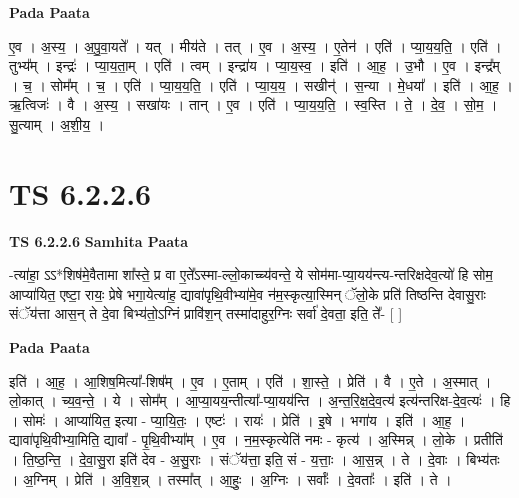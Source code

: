 \documentclass[17pt]{extarticle}
\begin{document}
\textbf{Pada Paata} \newline

ए॒व । अ॒स्य॒ । अ॒पु॒वा॒यते᳚ । यत् । मीय॑ते । तत् । ए॒व । अ॒स्य॒ । ए॒तेन॑ । एति॑ । प्या॒य॒य॒ति॒ । एति॑ । तुभ्य᳚म् । इन्द्रः॑ । प्या॒य॒ता॒म् । एति॑ । त्वम् । इन्द्रा॑य । प्या॒य॒स्व॒ । इति॑ । आ॒ह॒ । उ॒भौ । ए॒व । इन्द्र᳚म् । च॒ । सोम᳚म् । च॒ । एति॑ । प्या॒य॒य॒ति॒ । एति॑ । प्या॒य॒य॒ । सखीन्॑ । स॒न्या । मे॒धया᳚ । इति॑ । आ॒ह॒ । ऋ॒त्विजः॑ । वै । अ॒स्य॒ । सखा॑यः । तान् । ए॒व । एति॑ । प्या॒य॒य॒ति॒ । स्व॒स्ति । ते॒ । दे॒व॒ । सो॒म॒ । सु॒त्याम् । अ॒शी॒य॒ ।  \newline




\section*{ TS 6.2.2.6 }

\textbf{TS 6.2.2.6 } \newline
\textbf{Samhita Paata} \newline

-त्या॑हा॒ ऽऽ*शिष॑मे॒वैतामा शा᳚स्ते॒ प्र वा ए॒ते᳚ऽस्मा-ल्लो॒काच्च्य॑वन्ते॒ ये सोम॑मा-प्या॒यय॑न्त्य-न्तरिक्षदेव॒त्यो॑ हि सोम॒ आप्या॑यित॒ एष्टा॒ रायः॒ प्रेषे भगा॒येत्या॑ह॒ द्यावा॑पृथि॒वीभ्या॑मे॒व न॑म॒स्कृत्या॒स्मिन् ॅलो॒के प्रति॑ तिष्ठन्ति देवासु॒राः संॅय॑त्ता आस॒न् ते दे॒वा बिभ्य॑तो॒ऽग्निं प्रावि॑श॒न् तस्मा॑दाहुर॒ग्निः सर्वा॑ दे॒वता॒ इति॒ ते᳚- [  ] \newline

\textbf{Pada Paata} \newline

इति॑ । आ॒ह॒ । आ॒शिष॒मित्या᳚-शिष᳚म् । ए॒व । ए॒ताम् । एति॑ । शा॒स्ते॒ । प्रेति॑ । वै । ए॒ते । अ॒स्मात् । लो॒कात् । च्य॒व॒न्ते॒ । ये । सोम᳚म् । आ॒प्या॒यय॒न्तीत्या᳚-प्या॒यय॑न्ति । अ॒न्त॒रि॒क्ष॒दे॒व॒त्य॑ इत्य॑न्तरिक्ष-दे॒व॒त्यः॑ । हि । सोमः॑ । आप्या॑यित॒ इत्या - प्या॒यि॒तः॒ । एष्टः॑ । रायः॑ । प्रेति॑ । इ॒षे । भगा॑य । इति॑ । आ॒ह॒ । द्यावा॑पृथि॒वीभ्या॒मिति॒ द्यावा᳚ - पृ॒थि॒वीभ्या᳚म् । ए॒व । न॒म॒स्कृत्येति॑ नमः - कृत्य॑ । अ॒स्मिन्न् । लो॒के । प्रतीति॑ । ति॒ष्ठ॒न्ति॒ । दे॒वा॒सु॒रा इति॑ देव - अ॒सु॒राः । संॅय॑त्ता॒ इति॒ सं - य॒त्ताः॒ । आ॒स॒न्न् । ते । दे॒वाः । बिभ्य॑तः । अ॒ग्निम् । प्रेति॑ । अ॒वि॒श॒न्न् । तस्मा᳚त् । आ॒हुः॒ । अ॒ग्निः । सर्वाः᳚ । दे॒वताः᳚ । इति॑ । ते ।  \newline




\end{document}
